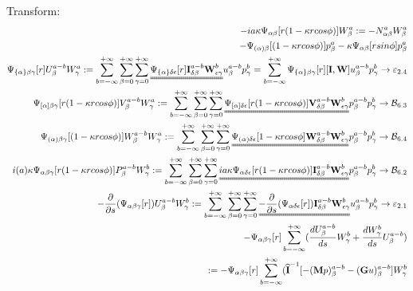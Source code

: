 \documentclass{Note}
\begin{document}
Transform:
\begin{equation}
\begin{aligned}
-ia\kappa \Psi_{\alpha\beta}[r(1-\kappa rcos\phi)]W_\beta^a:=-N_{\alpha\beta}^a W_\beta^a\\
-\Psi_{(\alpha)\beta}[(1-\kappa r cos\phi)]p_\beta^a-\kappa \Psi_{\alpha\beta}[r sin\phi]p_\beta^a\\
 \Psi_{\{\alpha\}\beta\gamma} [r]U_\beta^{a-b}W_\gamma^a:=\sum_{b=-\infty}^{+\infty} \sum_{\beta=0}^{+\infty}\sum_{\gamma=0}^{+\infty}\uuline{ \Psi_{\{\alpha\}\delta\epsilon}[r]\textbf{I}_{\delta\beta}^{a-b}\textbf{W}_{\epsilon\gamma}^{b}}u_\beta^{a-b}p_\gamma^{b}=\sum_{b=-\infty}^{+\infty}\Psi_{\{\alpha\}\beta\gamma}[r][\textbf{I},\textbf{W}]u_\beta^{a-b}p_\gamma^{b}\rightarrow\mathcal{\varepsilon}_{2.4}\\
 \Psi_{[\alpha]\beta\gamma} [r(1-\kappa rcos\phi)]V_\beta^{a-b}W_\gamma^a:=\sum_{b=-\infty}^{+\infty} \sum_{\beta=0}^{+\infty}\sum_{\gamma=0}^{+\infty}\uuline{ \Psi_{[\alpha]\delta\epsilon}[r(1-\kappa r cos\phi)]\textbf{V}_{\delta\beta}^{a-b}\textbf{W}_{\epsilon\gamma}^{b}}p_\beta^{a-b}p_\gamma^{b}\rightarrow\mathcal{B}_{6.3}\\
\Psi_{(\alpha)\beta\gamma} [(1-\kappa rcos\phi)]W_\beta^{a-b}W_\gamma^a:=\sum_{b=-\infty}^{+\infty} \sum_{\beta=0}^{+\infty}\sum_{\gamma=0}^{+\infty}\uuline{ \Psi_{(\alpha)\delta\epsilon}[1-\kappa r cos\phi]\textbf{W}_{\delta\beta}^{a-b}\textbf{W}_{\epsilon\gamma}^{b}}p_\beta^{a-b}p_\gamma^{b}\rightarrow\mathcal{B}_{6.4}\\
 i(a)\kappa \Psi_{\alpha\beta\gamma}[r(1-\kappa r cos\phi)]P_\beta^{a-b}W_\gamma^{b}:=\sum_{b=-\infty}^{+\infty} \sum_{\beta=0}^{+\infty}\sum_{\gamma=0}^{+\infty}\uuline{ ia\kappa \Psi_{\alpha\delta\epsilon}[r(1-\kappa r cos\phi)]\textbf{I}_{\delta\beta}^{a-b}\textbf{W}_{\epsilon\gamma}^{b}}p_\beta^{a-b}p_\gamma^{b}\rightarrow\mathcal{B}_{6.2}\\
 -{{\partial }\over {\partial s}}(\Psi_{\alpha\beta\gamma}[r])U_\beta^{a-b}W_\gamma^{b}:=\sum_{b=-\infty}^{+\infty} \sum_{\beta=0}^{+\infty}\sum_{\gamma=0}^{+\infty}\uuline{-{\partial\over \partial s} (\Psi_{\alpha\delta\epsilon}[r])\textbf{I}_{\delta\beta}^{a-b}\textbf{W}_{\epsilon\gamma}^{b}}u_\beta^{a-b}p_\gamma^{b}\rightarrow\mathcal{\varepsilon}_{2.1}\\
-\Psi_{\alpha\beta\gamma}[r]\sum_{b=-\infty}^{+\infty}({{d U_\beta^{a-b} \over {d s}}W_\gamma^{b}}+{dW_\gamma^{b}\over ds}U_\beta^{a-b})\\
:=-\Psi_{\alpha\beta\gamma}[r]\sum_{b=-\infty}^{+\infty}(\widehat{\textbf{I}}^{-1}[-{(\textbf{M}p)_\beta^{a-b}-(\textbf{G}u)_\beta^{a-b}]W_\gamma^{b}}

\end{aligned}
\end{equation}
\end{document}

